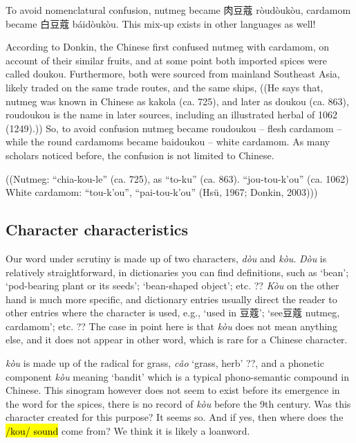 \documentclass[12pt]{article}
\newcommand{\tc}[1]{\traditionalchinesefont{#1}\rmfamily}
\begin{document}
To avoid nomenclatural confusion, nutmeg became 肉豆蔻 ròudòukòu, cardamom became 白豆蔻 báidòukòu.
This mix-up exists in other languages as well!

According to Donkin, the Chinese first confused nutmeg with cardamom, on account of their similar fruits, and at some point both imported spices were called doukou.
Furthermore, both were sourced from mainland Southeast Asia, likely traded on the same trade routes, and the same ships, ((He says that, nutmeg was known in Chinese as kakola (ca. 725), and later as doukou (ca. 863), roudoukou is the name in later sources, including an illustrated herbal of 1062 (1249).))
So, to avoid confusion nutmeg became roudoukou – flesh cardamom – while the round cardamoms became baidoukou – white cardamom.
As many scholars noticed before, the confusion is not limited to Chinese.

((Nutmeg: “chia-kou-le” (ca. 725), as “to-ku” (ca. 863). “jou-tou-k’ou” (ca. 1062)
White cardamom: “tou-k’ou”, “pai-tou-k’ou” (Hsü, 1967; Donkin, 2003)))



\subsection{Character characteristics}

Our word under scrutiny is made up of two characters, \tc{豆} \textit{dòu} and \tc{蔻} \textit{kòu}. \textit{Dòu} is relatively straightforward, in dictionaries you can find definitions, such as `bean'; `pod-bearing plant or its seeds'; `bean-shaped object'; etc. ?? \textit{Kòu} on the other hand is much more specific, and dictionary entries usually direct the reader to other entries where the character is used, e.g., `used in 豆蔻'; `see豆蔻 nutmeg, cardamom'; etc. ?? The case in point here is that \textit{kòu} does not mean anything else, and it does not appear in other word, which is rare for a Chinese character. 

\tc{蔻} \textit{kòu} is made up of the radical for grass, \tc{艹} \textit{cǎo} `grass, herb' ??, and a phonetic component \tc{寇} \textit{kòu} meaning `bandit' which is a typical phono-semantic compound in Chinese. This sinogram however does not seem to exist before its emergence in the word for the spices, there is no record of \tc{蔻} \textit{kòu} before the 9th century. Was this character created for this purpose? It seems so. And if yes, then where does the \hl{/kou/ sound} come from? We think it is likely a loanword.
\end{document}
